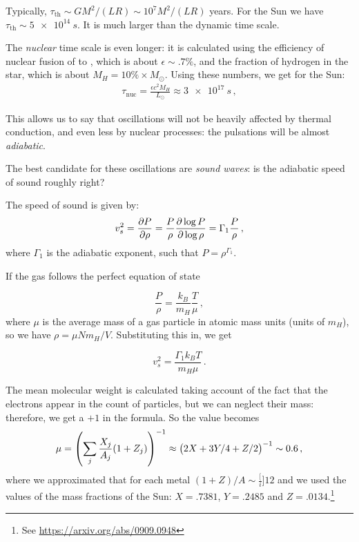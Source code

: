 \documentclass[main.tex]{subfiles}
\begin{document}
Typically, \(\tau_{\text{th}} \sim G M^2 /(LR) \sim 10^7 M^2/(LR) \) years.  
For the Sun we have \(\tau_{\text{th}} \sim \SI{5e14}{s}\). 
It is much larger than the dynamic time scale.

The \emph{nuclear} time scale is even longer: it is calculated using the efficiency of nuclear fusion of  to , which is about \(\epsilon \sim \num{.7} \% \), and the fraction of hydrogen in the star, which is about \(M_H = \num{10} \% \times M_{\odot} \). Using these numbers, we get for the Sun:
%
\begin{align}
\tau_{\text{nuc}} = \frac{\epsilon c^2  M_H}{L_{\odot}} \approx \SI{3e17}{s}
\,,
\end{align}
%


This allows us to say that oscillations will not be heavily affected by thermal conduction, and even less by nuclear processes: the pulsations will be almost \emph{adiabatic}.

The best candidate for these oscillations are \emph{sound waves}: is the adiabatic speed of sound roughly right?

The speed of sound is given by:
%
\begin{equation}
  v_s^2 = \pdv{P}{\rho } = \frac{P}{\rho} \pdv{\log P }{\log
  \rho } = \Gamma_1 \frac{P}{\rho}\,,
\end{equation}
%
where \(\Gamma_1 \) is the adiabatic exponent, such that \(P = \rho^{\Gamma_1 }\).  

If the gas follows the perfect equation of state

\begin{equation}
  \frac{P}{\rho} = \frac{k_B}{m_H} \frac{T}{\mu}  \,,
\end{equation}
%
where \(\mu \) is the average mass of a gas particle in atomic mass units (units of \(m_H\)), so we have \(\rho = \mu N m_H / V\). 
Substituting this in, we get

\begin{equation}
  v_s^2 = \frac{\Gamma_1 k_B T}{m_H \mu}  \,.
\end{equation}

The mean molecular weight is calculated taking account of the fact that the electrons appear in the count of particles, but we can neglect their mass: therefore, we get a \(+1\) in the formula. So the value becomes 
%
\begin{align}
\mu = \qty(\sum_{j} \frac{X_j}{A_j} (1+Z_j))^{-1} \approx \qty(2X + 3Y/4 + Z/2)^{-1} \sim 0.6
\,,
\end{align}
%
where we approximated that for each metal \((1+Z) / A \sim \frac[i]{1}{2} \) and we used the values of the mass fractions of the Sun: \(X =\num{.7381}\), \(Y = \num{.2485}\) and \(Z = \num{.0134}\).\footnote{See \url{https://arxiv.org/abs/0909.0948}} 
\end{document}

